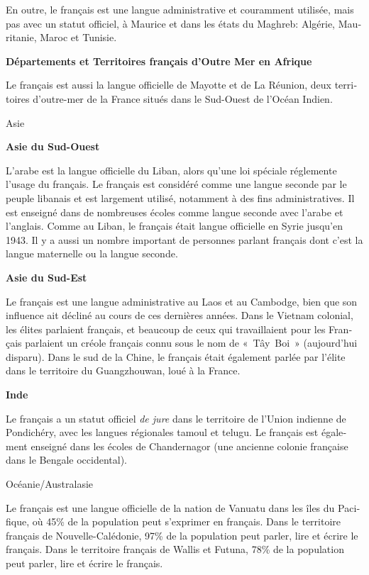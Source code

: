 \begin{french}
\begin{multicols}{2}
En outre, le français est une langue administrative et couramment
utilisée, mais pas avec un statut officiel, à Maurice et dans les
états du Maghreb: Algérie, Mauritanie, Maroc et Tunisie.

{\bf Départements et Territoires français d'Outre Mer en Afrique}

Le français est aussi la langue officielle de Mayotte et de La
Réunion, deux territoires d'outre-mer de la France situés dans
le Sud-Ouest de l'Océan Indien.

\begin{center}
{\sc Asie}
\end{center}

{\bf Asie du Sud-Ouest}

L'arabe est la langue officielle du Liban, alors qu'une 
loi spéciale réglemente l'usage du français. Le
français est considéré comme une langue seconde par le peuple libanais
et est largement utilisé, notamment à des fins administratives. Il est
enseigné dans de nombreuses écoles comme langue seconde avec l'arabe et l'anglais. Comme au Liban, le français était
langue officielle en Syrie jusqu'en 1943. Il y a aussi un
nombre important de personnes parlant français dont c'est la
langue maternelle ou la langue seconde.

{\bf Asie du Sud-Est}

Le français est une langue administrative au
Laos et au Cambodge, bien que son influence ait décliné au cours de
ces dernières années. Dans le Vietnam colonial, les élites parlaient
français, et beaucoup de ceux qui travaillaient pour les Français
parlaient un créole français connu sous le nom de «~Tây~Boi~»
(aujourd'hui disparu).  Dans le sud de la Chine, le français
était également parlée par l'élite dans le territoire du
Guangzhouwan, loué à la France.

{\bf Inde}

Le français a un statut officiel {\em de jure} dans le territoire de l'Union indienne de Pondichéry, avec les langues régionales tamoul
et telugu. Le français est également enseigné dans les écoles de
Chandernagor (une ancienne colonie française dans le Bengale
occidental).

\begin{center}
{\sc Océanie/Australasie}
\end{center}

Le français est une langue officielle de la nation de Vanuatu dans les
îles du Pacifique, où 45\% de la population peut s'exprimer en
français. Dans le territoire français de Nouvelle-Calédonie, 97\% de
la population peut parler, lire et écrire le français. Dans le
territoire français de Wallis et Futuna, 78\% de la population peut
parler, lire et écrire le français.


\end{multicols}
\end{french}
